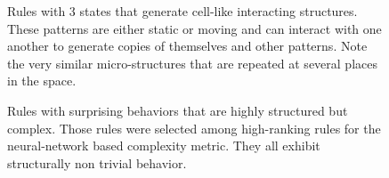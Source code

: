 \begin{figure}[t]
  \centering
  \hfil
  \caption{Rules with 3 states that generate cell-like interacting structures.
    These patterns are either static or moving and can interact with one another
    to generate copies of themselves and other patterns. Note the very similar
    micro-structures that are repeated at several places in the space.}
  \label{fig:micro}
\end{figure}


\begin{figure}
  \centering
  \hfil
  \caption{Rules with surprising behaviors that are highly structured but
    complex. Those rules were selected among high-ranking rules for the
    neural-network based complexity metric. They all exhibit structurally non
    trivial behavior.}
  \label{fig:odd}
\end{figure}

